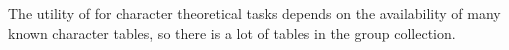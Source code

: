 %

The utility   of {\GAP} for character theoretical    tasks depends on the
availability of many known character tables, so there  is a lot of tables
in the {\GAP} group collection.

